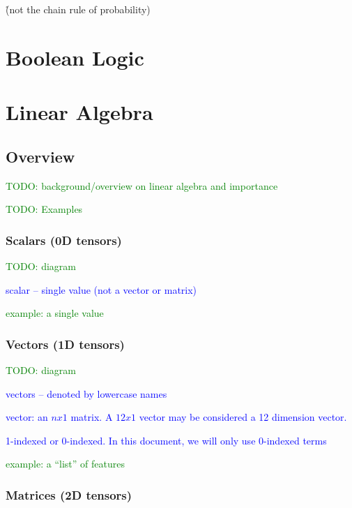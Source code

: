 \r{(not the chain rule of probability)}



\section{Boolean Logic}




\section{Linear Algebra}

\subsection{Overview}

\textcolor{green}{TODO: background/overview on linear algebra and importance}

\textcolor{green}{TODO: Examples}

\subsubsection{Scalars (0D tensors)}

\textcolor{green}{TODO: diagram}

\textcolor{blue}{scalar -- single value (not a vector or matrix)}

\textcolor{green}{example: a single value}


\subsubsection{Vectors (1D tensors)}

\textcolor{green}{TODO: diagram}

\textcolor{blue}{vectors -- denoted by lowercase names}

\textcolor{blue}{vector: an $n x 1$ matrix. A $12 x 1$ vector may be considered a 12 dimension vector.}

\textcolor{blue}{1-indexed or 0-indexed. In this document, we will only use 0-indexed terms}

\textcolor{green}{example: a ``list'' of features}


\subsubsection{Matrices (2D tensors)}


